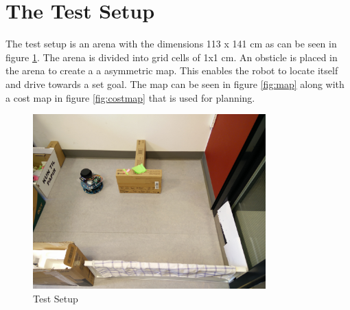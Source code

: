 \section{The Test Setup}
The test setup is an arena with the dimensions 113 x 141 cm as can be seen in figure \ref{fig:testsetup}. The arena is divided into grid cells of 1x1 cm. An obsticle is placed in  the arena to create a a asymmetric map. This enables the robot to locate itself and drive towards a set goal. The map can be seen in figure \ref{fig:map} along with a cost map in figure \ref{fig:costmap} that is used for planning.
\begin{figure}[H]
\centering
\includegraphics[width=0.8\textwidth]{billeder/testsetup}
\caption{Test Setup}
\label{fig:testsetup}
\end{figure}

